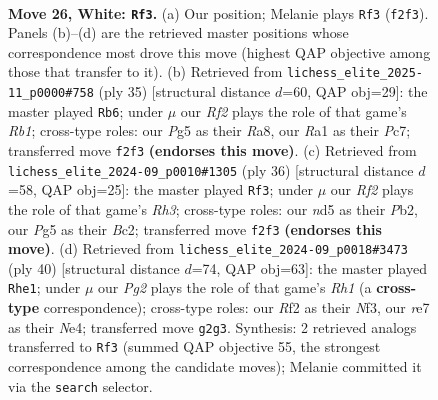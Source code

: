 \documentclass[11pt]{article}
\begin{document}
\clearpage

\begin{figure}[p]\centering
\begin{subfigure}{0.46\textwidth}\centering
\resizebox{\linewidth}{!}{%
\newchessgame
\chessboard[
  setfen={5r1k/4rppp/1nb1p3/p1Nn2P1/8/1P2P3/P4RPP/RN1B2K1 w - - 1 26},
  showmover=false,
  pgfstyle=straightmove, color=movearrow, markmove={f2-f3}
]}
\caption{}
\end{subfigure}\hfill
\begin{subfigure}{0.46\textwidth}\centering
\resizebox{\linewidth}{!}{%
\newchessgame
\chessboard[
  setfen={rr4k1/2pb1ppp/4p3/p2n4/2pP4/2N2PP1/PP1BP2P/1R2R1K1 b - - 2 18},
  showmover=false,
  pgfstyle=straightmove, color=movearrow, markmove={b8-b6}
]}
\caption{}
\end{subfigure}
\\[4pt]
\begin{subfigure}{0.46\textwidth}\centering
\resizebox{\linewidth}{!}{%
\newchessgame
\chessboard[
  setfen={2k4r/1p1r1ppp/p4n2/2b2PB1/6n1/2N4R/PPB2PPP/R5K1 w - - 0 19},
  showmover=false,
  pgfstyle=straightmove, color=movearrow, markmove={h3-f3}
]}
\caption{}
\end{subfigure}\hfill
\begin{subfigure}{0.46\textwidth}\centering
\resizebox{\linewidth}{!}{%
\newchessgame
\chessboard[
  setfen={r6r/p2nkpp1/4p3/4Pn1p/1p1pN2P/5N2/PP3PP1/1K1R3R w - - 0 21},
  showmover=false,
  pgfstyle=straightmove, color=movearrow, markmove={h1-e1}
]}
\caption{}
\end{subfigure}
\caption{\textbf{Move 26, White: \texttt{Rf3}.} (a) Our position; Melanie plays \texttt{Rf3} (\texttt{f2f3}). Panels (b)--(d) are the retrieved master positions whose correspondence most drove this move (highest QAP objective among those that transfer to it). (b) Retrieved from \texttt{lichess\_elite\_2025-11\_p0000\#758} (ply 35) [structural distance $d$=60, QAP obj=29]: the master played \texttt{Rb6}; under $\mu$ our \emph{Rf2} plays the role of that game's \emph{Rb1}; cross-type roles: our \emph{P}g5 as their \emph{R}a8, our \emph{R}a1 as their \emph{P}c7; transferred move \texttt{f2f3} \textbf{(endorses this move)}. (c) Retrieved from \texttt{lichess\_elite\_2024-09\_p0010\#1305} (ply 36) [structural distance $d$=58, QAP obj=25]: the master played \texttt{Rf3}; under $\mu$ our \emph{Rf2} plays the role of that game's \emph{Rh3}; cross-type roles: our \emph{n}d5 as their \emph{P}b2, our \emph{P}g5 as their \emph{B}c2; transferred move \texttt{f2f3} \textbf{(endorses this move)}. (d) Retrieved from \texttt{lichess\_elite\_2024-09\_p0018\#3473} (ply 40) [structural distance $d$=74, QAP obj=63]: the master played \texttt{Rhe1}; under $\mu$ our \emph{Pg2} plays the role of that game's \emph{Rh1} (a \textbf{cross-type} correspondence); cross-type roles: our \emph{R}f2 as their \emph{N}f3, our \emph{r}e7 as their \emph{N}e4; transferred move \texttt{g2g3}. Synthesis: 2 retrieved analogs transferred to \texttt{Rf3} (summed QAP objective 55, the strongest correspondence among the candidate moves); Melanie committed it via the \texttt{search} selector.}
\label{fig:thought-m50}
\end{figure}
\end{document}
